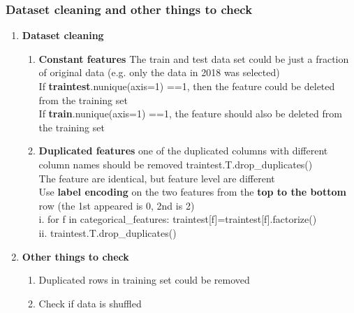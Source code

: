\documentclass[11pt, twoside]{article}   	%
\begin{document}
\subsubsection{Dataset cleaning and other things to check}
    \begin{enumerate}
      \item  \textbf{Dataset cleaning}
        \begin{enumerate}
          \item \textbf{Constant features}
            \indent The train and test data set could be just a fraction of original data (e.g. only the data in 2018 was selected) 
            \\\indent If \textbf{traintest}.nunique(axis=1) ==1, then the feature could be deleted from the training set
            \\\indent  If \textbf{train}.nunique(axis=1) ==1, the feature should also be deleted from the training set
                       

           \item \textbf{Duplicated features}
            \indent  one of the duplicated columns with different column names should be removed 
            \indent  traintest.T.drop\_duplicates()
             \\\indent  The feature are identical, but feature level are different 
             \\\indent  Use \textbf{label encoding} on the two features from the \textbf{top to the bottom} row (the 1st appeared is 0, 2nd is 2) 
             \\\indent  i. for f in categorical\_features:  traintest[f]=traintest[f].factorize()    
                \\\indent  ii. traintest.T.drop\_duplicates()       


           
         \end{enumerate}
          
          \item  \textbf{Other things to check}
                  \begin{enumerate}
          \item Duplicated rows in training set could be removed
          \item Check if data is shuffled    
         \end{enumerate}

          
    \end{enumerate}
\end{document}
